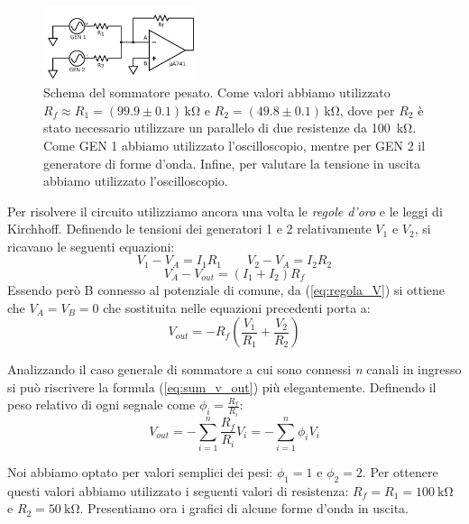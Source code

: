 \begin{figure}
  \begin{center}
    \includegraphics[width=0.40\textwidth]{../E01/latex/c2.pdf}
  \end{center}
  \caption{Schema del sommatore pesato. Come valori abbiamo utilizzato $R_f \approx R_1=(99.9 \pm 0.1)\,\si{\kilo\ohm}$ e $R_2=(49.8 \pm 0.1)\,\si{\kilo\ohm}$, dove per $R_2$ è stato necessario utilizzare un parallelo di due resistenze da \SI{100}{\kilo\ohm}. Come GEN 1 abbiamo utilizzato l'oscilloscopio, mentre per GEN 2 il generatore di forme d'onda. Infine, per valutare la tensione in uscita abbiamo utilizzato l'oscilloscopio.}
\label{fig:sommatore_pesato}
\end{figure}

Per risolvere il circuito utilizziamo ancora una volta le \textit{regole d'oro} e le leggi di Kirchhoff. Definendo le tensioni dei generatori 1 e 2 relativamente $V_1$ e $V_2$, si ricavano le seguenti equazioni:
$$V_1 - V_A =I_1 R_1 \qquad V_2 - V_A =I_2 R_2$$
$$V_A - V_{out} =(I_1+I_2) R_f$$
Essendo però B connesso al potenziale di comune, da (\ref{eq:regola_V}) si ottiene che $V_A = V_B = 0$ che sostituita nelle equazioni precedenti porta a:
\begin{equation}
V_{out}=-R_f \left( \frac{V_1}{R_1}+\frac{V_2}{R_2}\right)
\label{eq:sum_v_out}
\end{equation}

Analizzando il caso generale di sommatore a cui sono connessi \textit{n} canali in ingresso si può riscrivere la formula (\ref{eq:sum_v_out}) più elegantemente. Definendo il peso relativo di ogni segnale come $\phi_i = \frac{R_f}{R_i}$:
\begin{equation*}
V_{out}=-\sum^{n}_{i=1} \frac{R_f}{R_{i}}V_{i}=-\sum^{n}_{i=1} \phi_i V_{i}
\end{equation*}

Noi abbiamo optato per valori semplici dei pesi: $\phi_1=1$ e $\phi_2=2$. Per ottenere questi valori abbiamo utilizzato i seguenti valori di resistenza: $R_f=R_1=\SI{100}{\kilo\ohm}$ e $R_2=\SI{50}{\kilo\ohm}$.
Presentiamo ora i grafici di alcune forme d'onda in uscita.

